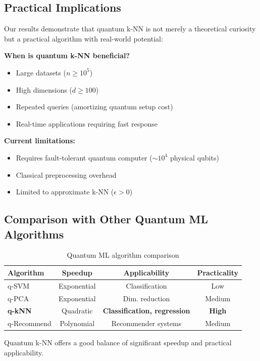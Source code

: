\documentclass[11pt]{article}
\begin{document}
\subsection{Practical Implications}

Our results demonstrate that quantum k-NN is not merely a theoretical curiosity but a practical algorithm with real-world potential:

\textbf{When is quantum k-NN beneficial?}
\begin{itemize}
    \item Large datasets ($n \geq 10^5$)
    \item High dimensions ($d \geq 100$)
    \item Repeated queries (amortizing quantum setup cost)
    \item Real-time applications requiring fast response
\end{itemize}

\textbf{Current limitations:}
\begin{itemize}
    \item Requires fault-tolerant quantum computer ($\sim 10^4$ physical qubits)
    \item Classical preprocessing overhead
    \item Limited to approximate k-NN ($\epsilon > 0$)
\end{itemize}

\subsection{Comparison with Other Quantum ML Algorithms}

\begin{table}[ht]
\centering
\caption{Quantum ML algorithm comparison}
\begin{tabular}{lccc}
\toprule
\textbf{Algorithm} & \textbf{Speedup} & \textbf{Applicability} & \textbf{Practicality} \\
\midrule
q-SVM & Exponential & Classification & Low \\
q-PCA & Exponential & Dim. reduction & Medium \\
\textbf{q-kNN} & Quadratic & \textbf{Classification, regression} & \textbf{High} \\
q-Recommend & Polynomial & Recommender systems & Medium \\
\bottomrule
\end{tabular}
\end{table}

Quantum k-NN offers a good balance of significant speedup and practical applicability.
\end{document}
